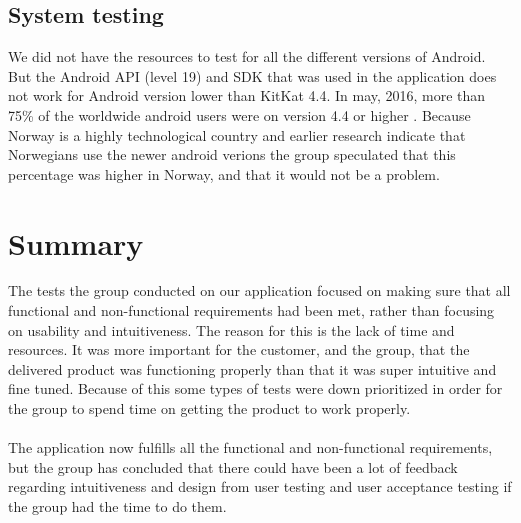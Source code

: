 \subsection{System testing}
We did not have the resources to test for all the different versions of Android. But the Android API (level 19) and SDK that was used in the application does not work for Android version lower than KitKat 4.4\cite{AndroidAPI}. In may, 2016, more than 75\% of the worldwide android users were on version 4.4 or higher \cite{AndroidVersions}. Because Norway is a highly technological country and earlier research indicate that Norwegians use the newer android verions \cite{AndroidVersionsNorge} the group speculated that this percentage was higher in Norway, and that it would not be a problem. 

\section{Summary}
The tests the group conducted on our application focused on making sure that all functional and non-functional requirements had been met, rather than focusing on usability and intuitiveness. The reason for this is the lack of time and resources. It was more important for the customer, and the group, that the delivered product was functioning properly than that it was super intuitive and fine tuned. Because of this some types of tests were down prioritized in order for the group to spend time on getting the product to work properly.
\\\\
The application now fulfills all the functional and non-functional requirements, but the group has concluded that there could have been a lot of feedback regarding intuitiveness and design from user testing and user acceptance testing if the group had the time to do them.
